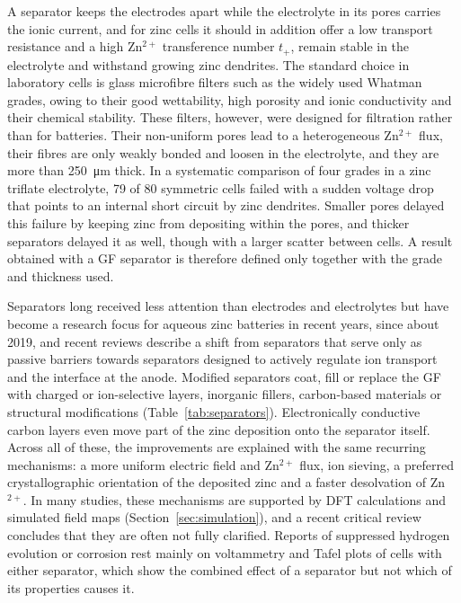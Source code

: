 A separator keeps the electrodes apart while the electrolyte in its pores carries the ionic current, and for zinc cells it should in addition offer a low transport resistance and a high Zn$^{2+}$ transference number $t_+$, remain stable in the electrolyte and withstand growing zinc dendrites\cite{gu_role_2025}.
The standard choice in laboratory cells is glass microfibre filters such as the widely used Whatman grades, owing to their good wettability, high porosity and ionic conductivity and their chemical stability\cite{liu_functional_2024,gu_role_2025}.
These filters, however, were designed for filtration rather than for batteries\cite{cytiva_laboratory_2025,gu_role_2025}.
Their non-uniform pores lead to a heterogeneous Zn$^{2+}$ flux\cite{gu_role_2025,fang_composite_2026}, their fibres are only weakly bonded and loosen in the electrolyte\cite{gu_role_2025,kim_mechanically_2025}, and they are more than \SI{250}{\um} thick\cite{hansen_role_2023,cytiva_laboratory_2025}.
In a systematic comparison of four grades in a zinc triflate electrolyte, 79 of 80 symmetric cells failed with a sudden voltage drop that points to an internal short circuit by zinc dendrites.
Smaller pores delayed this failure by keeping zinc from depositing within the pores, and thicker separators delayed it as well, though with a larger scatter between cells\cite{hansen_role_2023}.
A result obtained with a GF separator is therefore defined only together with the grade and thickness used.

Separators long received less attention than electrodes and electrolytes but have become a research focus for aqueous zinc batteries in recent years, since about 2019\cite{li_separator_2024,liu_functional_2024}, and recent reviews describe a shift from separators that serve only as passive barriers towards separators designed to actively regulate ion transport and the interface at the anode\cite{fang_composite_2026}.
Modified separators coat, fill or replace the GF with charged or ion-selective layers, inorganic fillers, carbon-based materials or structural modifications (Table~\ref{tab:separators}).
Electronically conductive carbon layers even move part of the zinc deposition onto the separator itself\cite{lee_hydrophilic_2024}.
Across all of these, the improvements are explained with the same recurring mechanisms: a more uniform electric field and Zn$^{2+}$ flux, ion sieving, a preferred crystallographic orientation of the deposited zinc and a faster desolvation of Zn$^{2+}$\cite{gu_role_2025}.
In many studies, these mechanisms are supported by DFT calculations\cite{luo_regulating_2024,yuan_synergistic_2025} and simulated field maps (Section~\ref{sec:simulation}), and a recent critical review concludes that they are often not fully clarified\cite{gu_role_2025}.
Reports of suppressed hydrogen evolution or corrosion rest mainly on voltammetry and Tafel plots of cells with either separator\cite{zhao_separator_2024,shao_selfrecognition_2025}, which show the combined effect of a separator but not which of its properties causes it.


